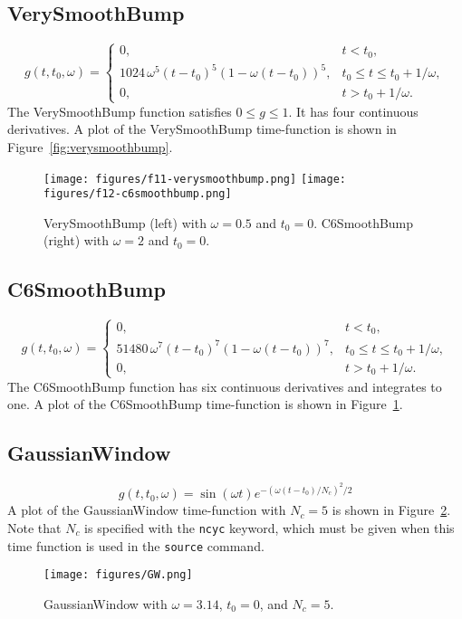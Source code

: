 \documentclass[11pt]{report}
\begin{document}
\subsection{VerySmoothBump} 
\[
g(t,t_0,\omega) = \left\{ 
\begin{array}{ll} 
0, & t < t_0,\\ 
1024\,\omega^5(t-t_0)^5 (1 - \omega(t-t_0))^5,& t_0 \leq t \leq t_0+1/\omega,\\ 
0, & t > t_0 + 1/\omega.
\end{array}
\right.
\]
The VerySmoothBump function satisfies $0\leq g\leq 1$. It has four continuous derivatives.
A plot of the VerySmoothBump time-function is shown in Figure~\ref{fig:verysmoothbump}.
\begin{figure}
\begin{centering}
  \texttt{[image: figures/f11-verysmoothbump.png]}
\hspace{10mm}
  \texttt{[image: figures/f12-c6smoothbump.png]}
  \caption{VerySmoothBump (left) with $\omega=0.5$ and
    $t_0=0$. C6SmoothBump (right) with $\omega=2$ and $t_0=0$.}
  \label{fig:verysmoothbump}  \label{fig:c6smoothbump}
\end{centering}
\end{figure}  
%
\subsection{C6SmoothBump} 
\[
g(t,t_0,\omega) = \left\{ 
\begin{array}{ll} 
0, & t < t_0,\\ 
51480\, \omega^7 (t-t_0)^7 (1- \omega(t-t_0))^7, & t_0 \leq t \leq t_0 + 1/\omega,\\ 
0, & t > t_0 + 1/\omega.
\end{array}
\right.
\]
The C6SmoothBump function has six continuous derivatives and integrates to one.
A plot of the C6SmoothBump time-function is shown in Figure~\ref{fig:c6smoothbump}.
%
\subsection{GaussianWindow}
\[
g(t,t_0,\omega) = \sin(\omega t) e^{-(\omega(t-t_0)/N_c)^2/2}
\]
A plot of the GaussianWindow time-function with $N_c=5$ is shown in
Figure~\ref{fig:gaussianwindow}. Note that $N_c$ is specified with the \verb+ncyc+ keyword, which
must be given when this time function is used in the \verb+source+ command.
\begin{figure}
\begin{centering}
  \texttt{[image: figures/GW.png]}
  \caption{GaussianWindow with $\omega=3.14$, $t_0=0$, and $N_c=5$.}
  \label{fig:gaussianwindow}
\end{centering}
\end{figure}  
\end{document}
